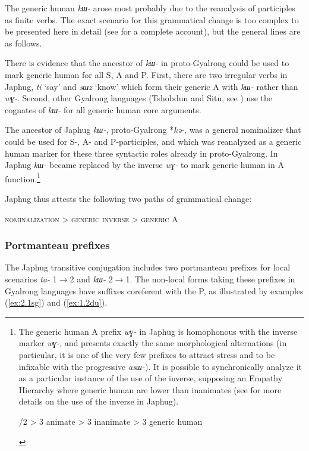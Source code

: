 \documentclass[oneside,a4paper,11pt]{article}
\newcommand{\ipa}[1]{\mbox{\phon\textit{#1}}} %
\begin{document}
The generic human \ipa{kɯ-} arose most probably due to the reanalysis of participles as finite verbs. The exact scenario for this grammatical change is too complex to be presented here in detail (see \citealt{jacques17generic} for a complete account), but the general lines are as follows.

There is evidence that the ancestor of \ipa{kɯ-} in proto-Gyalrong could be used to mark generic human for all S, A and P. First, there are two irregular verbs in Japhug, \ipa{ti} `say' and \ipa{sɯz} `know' which form their generic A with \ipa{kɯ-} rather than \ipa{wɣ-}. Second, other Gyalrong  languages (Tshobdun and Situ, see \citealt{sun14generic}) use the cognates of \ipa{kɯ-} for all generic human core arguments.
 
The ancestor of Japhug \ipa{kɯ-}, proto-Gyalrong *\ipa{kə-}, was a general nominalizer that could be used for S-, A- and P-participles, and which was reanalyzed as a generic human marker for these three syntactic roles already in proto-Gyalrong. In Japhug \ipa{kɯ-} became replaced by the inverse \ipa{wɣ-} to mark generic human in A function.\footnote{The generic human A prefix  \ipa{wɣ-} in Japhug is homophonous with the inverse marker \ipa{wɣ-}, and presents exactly the same morphological alternations (in particular, it is one of the very few prefixes to attract stress and to be infixable with the progressive \ipa{asɯ-}). It is possible to synchronically analyze it  as a particular instance of the use of the inverse, supposing an Empathy Hierarchy where generic human are lower than inanimates (see \citealt{jacques10inverse, jacques12demotion} for more details on the use of the inverse in Japhug). 

\begin{exe}
\ex 
{}/2 > 3 animate > 3 inanimate > 3 generic human
\end{exe}
}

Japhug thus attests the following two paths of grammatical change:

\begin{exe}
\ex 
\glt \textsc{nominalization} > \textsc{generic} 
\ex 
\glt \textsc{inverse} > \textsc{generic A}
\end{exe}

\subsubsection{Portmanteau prefixes}
The Japhug transitive conjugation includes two portmanteau prefixes for local scenarios \ipa{ta-} 1$\rightarrow$2 and \ipa{kɯ-} 2$\rightarrow$1.  The non-local forms taking these prefixes in Gyalrong languages have suffixes coreferent with the P, as illustrated by examples (\ref{ex:2.1sg}) and (\ref{ex:1.2du}).
\end{document}
